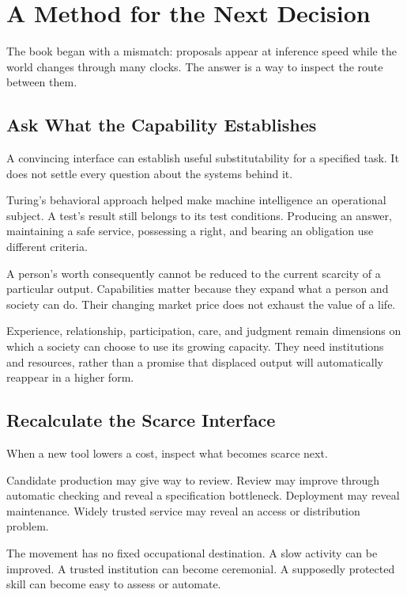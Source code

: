 \section{A Method for the Next Decision}

The book began with a mismatch: proposals appear at inference speed while the world changes through many clocks. The answer is a way to inspect the route between them.

\subsection{Ask What the Capability Establishes}

A convincing interface can establish useful substitutability for a specified task. It does not settle every question about the systems behind it.

Turing's behavioral approach helped make machine intelligence an operational subject. A test's result still belongs to its test conditions. Producing an answer, maintaining a safe service, possessing a right, and bearing an obligation use different criteria.

A person's worth consequently cannot be reduced to the current scarcity of a particular output. Capabilities matter because they expand what a person and society can do. Their changing market price does not exhaust the value of a life.

Experience, relationship, participation, care, and judgment remain dimensions on which a society can choose to use its growing capacity. They need institutions and resources, rather than a promise that displaced output will automatically reappear in a higher form.

\subsection{Recalculate the Scarce Interface}

When a new tool lowers a cost, inspect what becomes scarce next.

Candidate production may give way to review. Review may improve through automatic checking and reveal a specification bottleneck. Deployment may reveal maintenance. Widely trusted service may reveal an access or distribution problem.

The movement has no fixed occupational destination. A slow activity can be improved. A trusted institution can become ceremonial. A supposedly protected skill can become easy to assess or automate.

